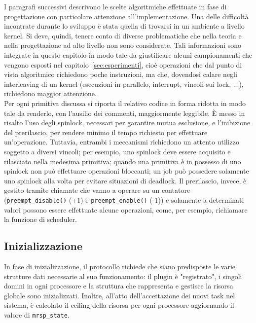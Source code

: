 I paragrafi successivi descrivono le scelte algoritmiche effettuate in fase di progettazione con particolare attenzione all'implementazione. Una delle difficoltà incontrate durante lo sviluppo è stata quella di trovarsi in un ambiente a livello kernel. Si deve, quindi, tenere conto di diverse problematiche che nella teoria e nella progettazione ad alto livello non sono considerate. Tali informazioni sono integrate in questo capitolo in modo tale da giustificare alcuni campionamenti che vengono esposti nel capitolo~\ref{sec:esperimenti}, cioè operazioni che dal punto di vista algoritmico richiedono poche instruzioni, ma che, dovendosi calare negli interleaving di un kernel (esecuzioni in parallelo, interrupt, vincoli sui lock, ...), richiedono maggior attenzione.\\

Per ogni primitiva discussa si riporta il relativo codice in forma ridotta in modo tale da renderlo, con l'ausilio dei commenti, maggiormente leggibile. \`E messo in risalto l'uso degli spinlock, necessari per garantire mutua esclusione, e l'inibizione del prerilascio, per rendere minimo il tempo richiesto per effettuare un'operazione. Tuttavia, entrambi i meccanismi richiedono un attento utilizzo soggetto a diversi vincoli; per esempio, uno spinlock deve essere acquisito e rilasciato nella medesima primitiva; quando una primitiva è in possesso di uno spinlock non può effettuare operazioni bloccanti; un job può possedere solamente uno spinlock alla volta per evitare situazioni di deadlock. Il prerilascio, invece, è gestito tramite chiamate che vanno a operare su un contatore (\texttt{preempt\_disable()} (+1) e \texttt{preempt\_enable()} (-1)) e solamente a determinati valori possono essere effettuate alcune operazioni, come, per esempio, richiamare la funzione di scheduler.

\subsection{Inizializzazione}
\label{sec:imp.init}

In fase di inizializzazione, il protocollo richiede che siano predisposte le varie strutture dati necessarie al suo funzionamento: il plugin è "registrato", i singoli domini in ogni processore e la struttura che rappresenta e gestisce la risorsa globale sono inizializzati. Inoltre, all'atto dell'accettazione dei nuovi task nel sistema, è calcolato il ceiling della risorsa per ogni processore aggiornando il valore di \texttt{mrsp\_state}.

